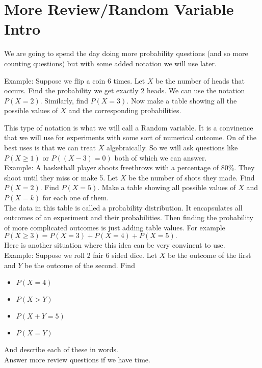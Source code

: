 \documentclass[14,fleqn]{article}
\begin{document}
\section{More Review/Random Variable Intro}
We are going to spend the day doing more probability questions (and so more counting questions) but with some added notation we will use later.

Example: Suppose we flip a coin 6 times. Let $X$ be the number of heads that occurs. Find the probability we get exactly 2 heads. We can use the notation $P(X=2).$ Similarly, find $P(X=3).$ Now make a table showing all the possible values of $X$ and the corresponding probabilities.

This type of notation is what we will call a Random variable. It is a convinence that we will use for experiments with some sort of numerical outcome. On of the best uses is that we can treat $X$ algebraically. So we will ask questions like $P(X\ge 1)$ or $P((X-3)=0)$ both of which we can answer.\\

Example: A basketball player shoots freethrows with a percentage of 80\%. They shoot until they miss or make 5. Let $X$ be the number of shots they made. Find $P(X=2).$ Find $P(X=5).$ Make a table showing all possible values of $X$ and $P(X=k)$ for each one of them.\\

The data in this table is called a probability distribution. It encapsulates all outcomes of an experiment and their probabilities. Then finding the probability of more complicated outcomes is just adding table values. For example $P(X\ge 3)=P(X=3)+P(X=4)+P(X=5).$\\

Here is another situation where this idea can be very convinent to use.\\

Example: Suppose we roll 2 fair 6 sided dice. Let $X$ be the outcome of the first and $Y$ be the outcome of the second. Find
\begin{itemize}
	\item $P(X=4)$
	\item $P(X>Y)$
	\item $P(X+Y=5)$
	\item $P(X=Y)$
\end{itemize}
And describe each of these in words.\\


Answer more review questions if we have time.
\end{document}
